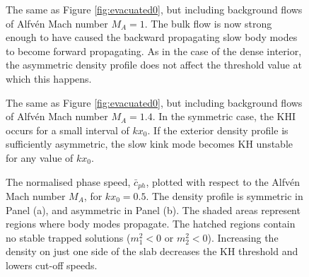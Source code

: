 \documentclass[12pt]{ociamthesis}
\begin{document}
\begin{figure}[t]
\centering
{}
\caption{The same as Figure \ref{fig:evacuated0}, but including background flows of Alfv\'en Mach number $M_A = 1$.
The bulk flow is now strong enough to have caused the backward propagating slow body modes to become forward propagating.
As in the case of the dense interior, the asymmetric density profile does not affect the threshold value at which this happens.}
\label{fig:evacuated2}
\end{figure}

\begin{figure}[t]
\centering
{}
\caption{The same as Figure \ref{fig:evacuated0}, but including background flows of Alfv\'en Mach number $M_A = 1.4$.
In the symmetric case, the KHI occurs for a small interval of $k x_0$.
If the exterior density profile is sufficiently asymmetric, the slow kink mode becomes KH unstable for any value of $k x_0$.}
\label{fig:evacuated3}
\end{figure}

\begin{figure}[!ht]
\centering
\end{figure}
\begin{figure}[!ht]%
\centering
{}
\caption{The normalised phase speed, $\bar c_{ph}$, plotted with respect to the Alfv\'en Mach number $M_A$, for $k x_0 = 0.5$.
The density profile is symmetric in Panel (a), and asymmetric in Panel (b).
The shaded areas represent regions where body modes propagate.
The hatched regions contain no stable trapped solutions ($m_1^2 < 0$ or $m_2^2 < 0$). Increasing the density on just one side of the slab decreases the KH threshold and lowers cut-off speeds.}
\label{fig:flow}
\end{figure}
\end{document}
